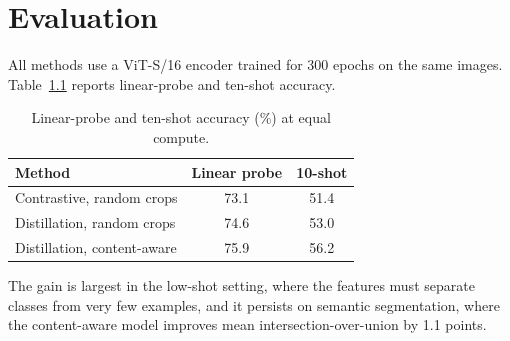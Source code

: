 \chapter{Evaluation}
\label{ch:results}

All methods use a ViT-S/16 encoder \citep{dosovitskiy2021} trained for 300 epochs on the same
images. Table~\ref{tab:probe} reports linear-probe and ten-shot accuracy.

\begin{table}[htbp]
  \centering
  \caption{Linear-probe and ten-shot accuracy (\%) at equal compute.}
  \label{tab:probe}
  \begin{tabular}{lcc}
    \toprule
    Method & Linear probe & 10-shot \\
    \midrule
    Contrastive, random crops    & 73.1 & 51.4 \\
    Distillation, random crops   & 74.6 & 53.0 \\
    Distillation, content-aware  & 75.9 & 56.2 \\
    \bottomrule
  \end{tabular}
\end{table}

The gain is largest in the low-shot setting, where the features must separate classes from very
few examples, and it persists on semantic segmentation, where the content-aware model improves
mean intersection-over-union by 1.1 points.

